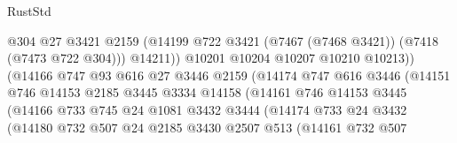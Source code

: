 \begin{lexlean}{RustStd}
\begin{coremodule}
                                      @304
                                      @27
                                      @3421
                                      @2159
                                      (@14199
                                        @722
                                        @3421
                                        (@7467 (@7468 @3421))
                                        (@7418 (@7473 @722 @304)))
                                      @14211))
                                  @10201
                                  @10204
                                  @10207
                                  @10210
                                  @10213))
                              (@14166
                                @747
                                @93
                                @616
                                @27
                                @3446
                                @2159
                                (@14174
                                  @747
                                  @616
                                  @3446
                                  (@14151
                                    @746
                                    @14153
                                    @2185
                                    @3445
                                    @3334
                                    @14158
                                    (@14161
                                      @746
                                      @14153
                                      @3445
                                      (@14166
                                        @733
                                        @745
                                        @24
                                        @1081
                                        @3432
                                        @3444
                                        (@14174
                                          @733
                                          @24
                                          @3432
                                          (@14180
                                            @732
                                            @507
                                            @24
                                            @2185
                                            @3430
                                            @2507
                                            @513
                                            (@14161
                                              @732
                                              @507

\end{coremodule}
\end{lexlean}
